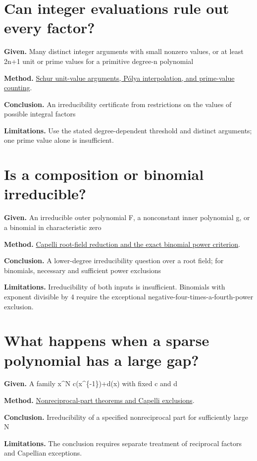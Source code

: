 \documentclass[11pt,a4paper,oneside,openany]{book}
\begin{document}
\section*{Can integer evaluations rule out every factor?}
\textbf{Given.} Many distinct integer arguments with small nonzero values, or at least 2n+1 unit or prime values for a primitive degree-n polynomial\par
\textbf{Method.} \hyperlink{article:integer-values}{Schur unit-value arguments, Pólya interpolation, and prime-value counting}.\par
\textbf{Conclusion.} An irreducibility certificate from restrictions on the values of possible integral factors\par
\textbf{Limitations.} Use the stated degree-dependent threshold and distinct arguments; one prime value alone is insufficient.\par\medskip
\section*{Is a composition or binomial irreducible?}
\textbf{Given.} An irreducible outer polynomial F, a nonconstant inner polynomial g, or a binomial in characteristic zero\par
\textbf{Method.} \hyperlink{article:capelli-composition}{Capelli root-field reduction and the exact binomial power criterion}.\par
\textbf{Conclusion.} A lower-degree irreducibility question over a root field; for binomials, necessary and sufficient power exclusions\par
\textbf{Limitations.} Irreducibility of both inputs is insufficient. Binomials with exponent divisible by 4 require the exceptional negative-four-times-a-fourth-power exclusion.\par\medskip
\section*{What happens when a sparse polynomial has a large gap?}
\textbf{Given.} A family x\textasciicircum{}N c(x\textasciicircum{}\{-1\})+d(x) with fixed c and d\par
\textbf{Method.} \hyperlink{article:sparse-gaps}{Nonreciprocal-part theorems and Capelli exclusions}.\par
\textbf{Conclusion.} Irreducibility of a specified nonreciprocal part for sufficiently large N\par
\textbf{Limitations.} The conclusion requires separate treatment of reciprocal factors and Capellian exceptions.\par\medskip
\end{document}
